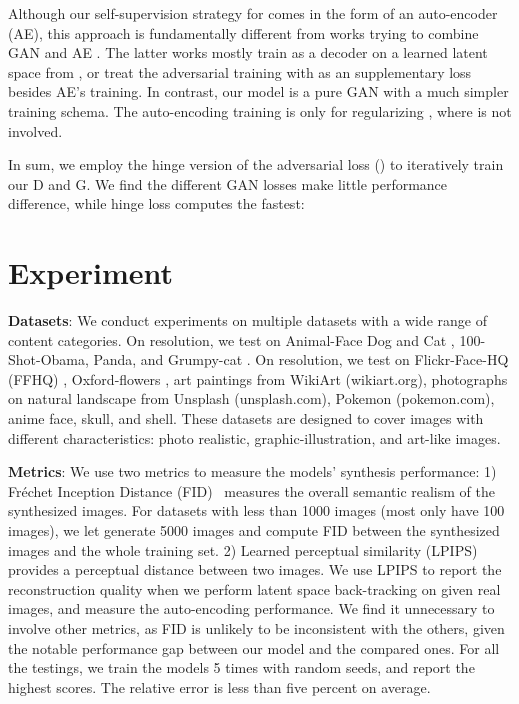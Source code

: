 \documentclass{article} \usepackage{iclr2021_conference,times}
\begin{document}
Although our self-supervision strategy for  comes in the form of an auto-encoder (AE), this approach is fundamentally different from works trying to combine GAN and AE \citep{larsen2016autoencoding,guo2019auto,zhao2016energy,berthelot2017began}. The latter works mostly train  as a decoder on a learned latent space from , or treat the adversarial training with  as an supplementary loss besides AE's training. In contrast, our model is a pure GAN with a much simpler training schema. The auto-encoding training is only for regularizing , where  is not involved.




In sum, we employ the hinge version of the adversarial loss (\cite{lim2017geometric,tran2017deep}) to iteratively train our D and G. We find the different GAN losses make little performance difference, while hinge loss computes the fastest: 




\section{Experiment}

\textbf{Datasets}: We conduct experiments on multiple datasets with a wide range of content categories. On  resolution, we test on Animal-Face Dog and Cat \citep{si2011learning}, 100-Shot-Obama, Panda, and Grumpy-cat \citep{zhao2020differentiable}. On  resolution, we test on Flickr-Face-HQ (FFHQ) \citep{karras2019style}, Oxford-flowers \citep{Nilsback06}, art paintings from WikiArt (wikiart.org), photographs on natural landscape from Unsplash (unsplash.com), Pokemon (pokemon.com), anime face, skull, and shell. These datasets are designed to cover images with different characteristics: photo realistic, graphic-illustration, and art-like images.

\textbf{Metrics}: We use two metrics to measure the models' synthesis performance: 1) Fréchet Inception Distance (FID)~\citep{heusel2017gans} measures the overall semantic realism of the synthesized images. For datasets with less than 1000 images (most only have 100 images), we let  generate 5000 images and compute FID between the synthesized images and the whole training set. 2) Learned perceptual similarity (LPIPS)~\citep{zhang2018unreasonable} provides a perceptual distance between two images. We use LPIPS to report the reconstruction quality when we perform latent space back-tracking on  given real images, and measure the auto-encoding performance. We find it unnecessary to involve other metrics, as FID is unlikely to be inconsistent with the others, given the notable performance gap between our model and the compared ones. For all the testings, we train the models 5 times with random seeds, and report the highest scores. The relative error is less than five percent on average.   
\end{document}
